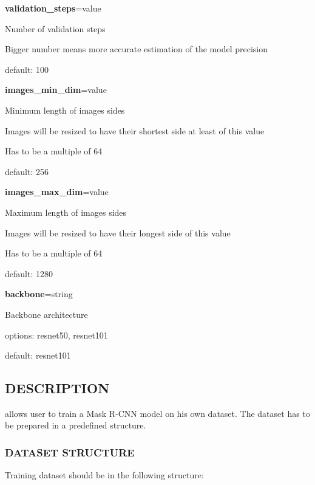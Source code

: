 \begin{flushleft}
\textbf{validation\_steps}=value

\tab Number of validation steps

\tab Bigger number means more accurate estimation of the model precision

\tab default: 100

\textbf{images\_min\_dim}=value

\tab Minimum length of images sides

\tab Images will be resized to have their shortest side at least of this value

\tab Has to be a multiple of 64

\tab default: 256

\textbf{images\_max\_dim}=value

\tab Maximum length of images sides

\tab Images will be resized to have their longest side of this value

\tab Has to be a multiple of 64

\tab default: 1280

\textbf{backbone}=string

\tab Backbone architecture

\tab options: resnet50, resnet101

\tab default: resnet101
\end{flushleft}

\subsection*{DESCRIPTION}
 allows user to train a Mask R-CNN model
on his own dataset. The dataset has to be prepared in a predefined structure. 

\subsubsection*{DATASET STRUCTURE}
Training dataset should be in the following structure: 

